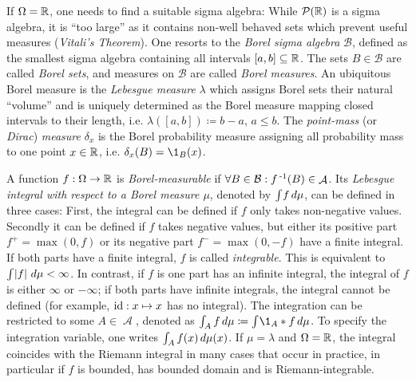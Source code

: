 \documentclass[a4paper,DIV=11]{scrreprt}
\DeclareMathOperator{\A}{\mathcal{A}}
\newcommand{\B}{\mathcal{B}}
\theoremstyle{definition}
\begin{document}
    If $\Omega = \mathbb{R}$, one needs to find a suitable sigma algebra: While $\operatorname{\mathcal{P}}(\mathbb{R})$ is a sigma algebra, it is “too large” as it contains non-well behaved sets which prevent useful measures (\emph{Vitali's Theorem}).
    One resorts to the \emph{Borel sigma algebra} $\B$, defined as the smallest sigma algebra containing all intervals $[a, b] \subseteq \mathbb{R}$.
    The sets $B \in \B$ are called \emph{Borel sets}, and measures on $\B$ are called \emph{Borel measures}.
    An ubiquitous Borel measure is the \emph{Lebesgue measure} $\lambda$ which assigns Borel sets their natural “volume” and is uniquely determined as the Borel measure mapping closed intervals to their length, i.e. $\lambda([a, b]) \coloneqq b-a$, $a \leq b$.
    The \emph{point-mass} (or \emph{Dirac}) \emph{measure} $\delta_x$ is the Borel probability measure assigning all probability mass to one point $x \in \mathbb{R}$, i.e. $\delta_x(B) = \1_B(x)$.
    \cite[p.23, p.45-47, p.177]{bib:billingsleyProbabilityAndMeasure}

    A function $f: \Omega \to \mathbb{R}$ is \emph{Borel-measurable} if $\forall B \in \B: f\inv(B) \in \A$.
    Its \emph{Lebesgue integral with respect to a Borel measure $\mu$}, denoted by $\int_{} f \, d\mu$, can be defined in three cases:
    First, the integral can be defined if $f$ only takes non-negative values.
    Secondly it can be defined if $f$ takes negative values, but either its positive part $f^+ = \max(0, f)$ or its negative part $f^- = \max(0, -f)$ have a finite integral.
    If both parts have a finite integral, $f$ is called \emph{integrable}. This is equivalent to $\int_{} \left| f \right| \, d\mu < \infty$.
    In contrast, if $f$ is one part has an infinite integral, the integral of $f$ is either $\infty$ or $-\infty$; if both parts have infinite integrals, the integral cannot be defined (for example, $\operatorname{id}: x \mapsto x$ has no integral).
    The integration can be restricted to some $A \in \A$, denoted as $\lintegral{A}{f}{\mu} \coloneqq \lintegral{}{\1_A*f}{\mu}$. To specify the integration variable, one writes $\int_{A} f(x) \, d\mu(x)$.
    If $\mu = \lambda$ and $\Omega = \mathbb{R}$, the integral coincides with the Riemann integral in many cases that occur in practice, in particular if $f$ is bounded, has bounded domain and is Riemann-integrable. \cite[Sections 13, 15-17]{bib:billingsleyProbabilityAndMeasure}
    
\end{document}
